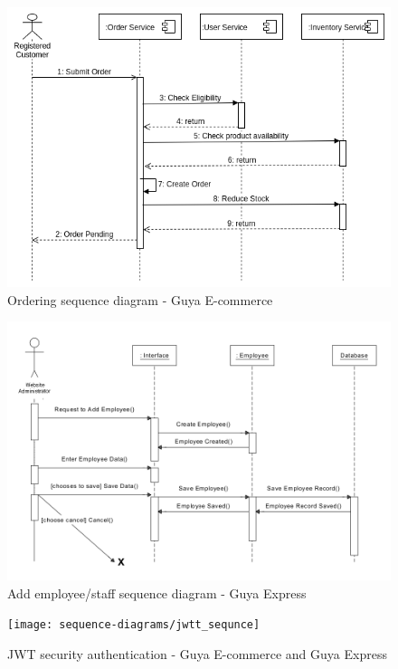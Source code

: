 \begin{figure}[!h]
\center
\includegraphics[width=15cm,keepaspectratio]{sequence-diagrams/order_sequence}
\caption{Ordering sequence diagram - Guya E-commerce}
\end{figure}

\begin{figure}[!h]
\center
\includegraphics[width=15cm,keepaspectratio]{sequence-diagrams/employee_sequence}
\caption{Add employee/staff sequence diagram - Guya Express}
\end{figure}

\begin{figure}[!h]
\center
\texttt{[image: sequence-diagrams/jwtt\_sequnce]}
\caption{JWT security authentication - Guya E-commerce and Guya Express}
\end{figure}


